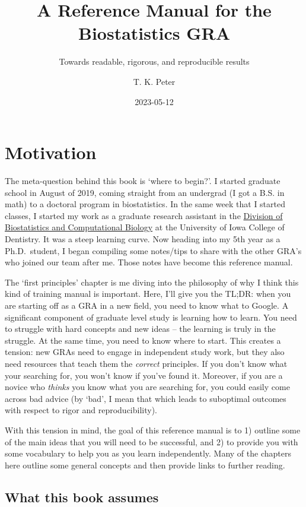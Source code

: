\documentclass[
]{book}
\title{A Reference Manual for the Biostatistics GRA}
\subtitle{Towards readable, rigorous, and reproducible results}
\author{T. K. Peter}
\date{2023-05-12}
\begin{document}
\maketitle

{
\setcounter{tocdepth}{1}
\tableofcontents
}
\hypertarget{motivation}{%
\chapter{Motivation}\label{motivation}}

The meta-question behind this book is `where to begin?'. I started graduate school in August of 2019, coming straight from an undergrad (I got a B.S. in math) to a doctoral program in biostatistics. In the same week that I started classes, I started my work as a graduate research assistant in the \href{https://dentistry.uiowa.edu/research/biostatistics-and-computational-biology}{Division of Biostatistics and Computational Biology} at the University of Iowa College of Dentistry. It was a steep learning curve. Now heading into my 5th year as a Ph.D.~student, I began compiling some notes/tips to share with the other GRA's who joined our team after me. Those notes have become this reference manual.

The `first principles' chapter is me diving into the philosophy of why I think this kind of training manual is important. Here, I'll give you the TL;DR: when you are starting off as a GRA in a new field, you need to know what to Google. A significant component of graduate level study is learning how to learn. You need to struggle with hard concepts and new ideas -- the learning is truly in the struggle. At the same time, you need to know where to start. This creates a tension: new GRAs need to engage in independent study work, but they also need resources that teach them the \emph{correct} principles. If you don't know what your searching for, you won't know if you've found it. Moreover, if you are a novice who \emph{thinks} you know what you are searching for, you could easily come across bad advice (by `bad', I mean that which leads to suboptimal outcomes with respect to rigor and reproducibility).

With this tension in mind, the goal of this reference manual is to 1) outline some of the main ideas that you will need to be successful, and 2) to provide you with some vocabulary to help you as you learn independently. Many of the chapters here outline some general concepts and then provide links to further reading.

\hypertarget{what-this-book-assumes}{%
\section{What this book assumes}\label{what-this-book-assumes}}
\end{document}
